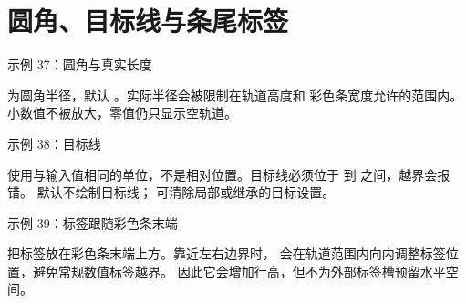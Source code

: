 \section{圆角、目标线与条尾标签}
\begin{example}{示例 37：圆角与真实长度}


\end{example}

 为圆角半径，默认 \key{0pt}。实际半径会被限制在轨道高度和
彩色条宽度允许的范围内。小数值不被放大，零值仍只显示空轨道。

\begin{example}{示例 38：目标线}

\end{example}

 使用与输入值相同的单位，不是相对位置。目标线必须位于
 到  之间，越界会报错。
默认不绘制目标线； 可清除局部或继承的目标设置。

\begin{example}{示例 39：标签跟随彩色条末端}


\end{example}

 把标签放在彩色条末端上方。靠近左右边界时，
会在轨道范围内向内调整标签位置，避免常规数值标签越界。
因此它会增加行高，但不为外部标签槽预留水平空间。

